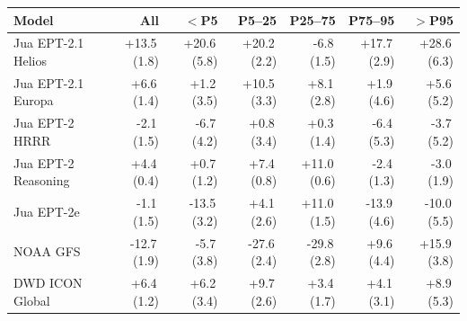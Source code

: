 \begin{tabular}{@{}lrrrrrr@{}}
\toprule
Model & All & $<$P5 & P5--25 & P25--75 & P75--95 & $>$P95 \\
\midrule
Jua EPT-2.1 Helios & +13.5\,(1.8) & +20.6\,(5.8) & +20.2\,(2.2) & -6.8\,(1.5) & +17.7\,(2.9) & +28.6\,(6.3) \\\addlinespace[0.35em]
Jua EPT-2.1 Europa & +6.6\,(1.4) & +1.2\,(3.5) & +10.5\,(3.3) & +8.1\,(2.8) & +1.9\,(4.6) & +5.6\,(5.2) \\\addlinespace[0.35em]
Jua EPT-2 HRRR & -2.1\,(1.5) & -6.7\,(4.2) & +0.8\,(3.4) & +0.3\,(1.4) & -6.4\,(5.3) & -3.7\,(5.2) \\\addlinespace[0.35em]
Jua EPT-2 Reasoning & +4.4\,(0.4) & +0.7\,(1.2) & +7.4\,(0.8) & +11.0\,(0.6) & -2.4\,(1.3) & -3.0\,(1.9) \\\addlinespace[0.35em]
Jua EPT-2e & -1.1\,(1.5) & -13.5\,(3.2) & +4.1\,(2.6) & +11.0\,(1.5) & -13.9\,(4.6) & -10.0\,(5.5) \\\addlinespace[0.35em]
NOAA GFS & -12.7\,(1.9) & -5.7\,(3.8) & -27.6\,(2.4) & -29.8\,(2.8) & +9.6\,(4.4) & +15.9\,(3.8) \\\addlinespace[0.35em]
DWD ICON Global & +6.4\,(1.2) & +6.2\,(3.4) & +9.7\,(2.6) & +3.4\,(1.7) & +4.1\,(3.1) & +8.9\,(5.3) \\
\bottomrule
\end{tabular}
